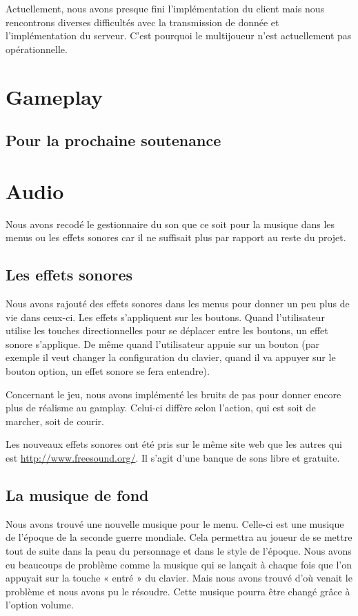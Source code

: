 \documentclass[11pt]{report}
\begin{document}
Actuellement, nous avons presque fini l'implémentation du client mais nous rencontrons diverses difficultés avec la transmission de donnée et l'implémentation du serveur. C'est pourquoi le multijoueur n'est actuellement pas opérationnelle.

\newpage
\section{Gameplay}

\subsection{Pour la prochaine soutenance}

\newpage
\section{Audio}

Nous avons recodé le gestionnaire du son que ce soit pour la musique dans les menus ou les effets sonores car il ne suffisait plus par rapport au reste du projet.

\subsection{Les effets sonores}

Nous avons rajouté des effets sonores dans les menus pour donner un peu plus de vie dans ceux-ci. Les effets s’appliquent sur les boutons. Quand l’utilisateur utilise les touches directionnelles pour se déplacer entre les boutons, un effet sonore s’applique. De même quand l’utilisateur appuie sur un bouton (par exemple il veut changer la configuration du clavier, quand il va appuyer sur le bouton option, un effet sonore se fera entendre).

Concernant le jeu, nous avons implémenté les bruits de pas pour donner encore plus de réalisme au gamplay. Celui-ci diffère selon l’action, qui est soit de marcher, soit de courir.

Les nouveaux effets sonores ont été pris sur le même site web que les autres qui est \url{http://www.freesound.org/}. Il s’agit d’une banque de sons libre et gratuite.

\subsection{La musique de fond}

Nous avons trouvé une nouvelle musique pour le menu. Celle-ci est une musique de l’époque de la seconde guerre mondiale. Cela permettra au joueur de se mettre tout de suite dans la peau du personnage et dans le style de l’époque. Nous avons eu beaucoups de problème comme la musique qui se lançait à chaque fois que l’on appuyait sur la touche « entré » du clavier. Mais nous avons trouvé d’où venait le problème et nous avons pu le résoudre. Cette musique pourra être changé grâce à l’option volume.
\end{document}
